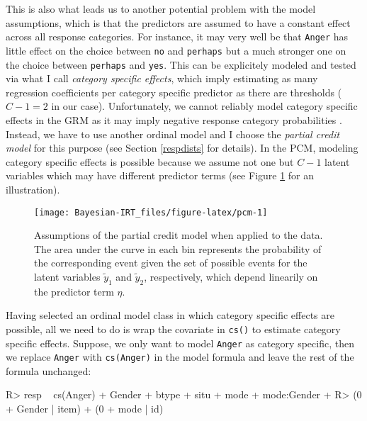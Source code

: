 \documentclass[jss]{jss}
\begin{document}
This is also what leads us to another potential problem with the model
assumptions, which is that the predictors are assumed to have a constant
effect across all response categories. For instance, it may very well be
that \texttt{Anger} has little effect on the choice between \texttt{no}
and \texttt{perhaps} but a much stronger one on the choice between
\texttt{perhaps} and \texttt{yes}. This can be explicitely modeled and
tested via what I call \emph{category specific effects}, which imply
estimating as many regression coefficients per category specific
predictor as there are thresholds (\(C - 1 = 2\) in our case).
Unfortunately, we cannot reliably model category specific effects in the
GRM as it may imply negative response category probabilities
\citep{buerkner2019}. Instead, we have to use another ordinal model and
I choose the \emph{partial credit model} \citep[PCM;][]{rasch1961} for
this purpose (see Section \ref{respdists} for details). In the PCM,
modeling category specific effects is possible because we assume not one
but \(C - 1\) latent variables which may have different predictor terms
(see Figure \ref{fig:pcm} for an illustration).

\begin{CodeChunk}
\begin{figure}

{\centering \texttt{[image: Bayesian-IRT\_files/figure-latex/pcm-1]} 

}

\caption{Assumptions of the partial credit model when applied to the  data. The area under the curve in each bin represents the probability of the corresponding event given the set of possible events for the latent variables $\tilde{y}_1$ and $\tilde{y}_2$, respectively, which depend linearily on the predictor term $\eta$.}\label{fig:pcm}
\end{figure}
\end{CodeChunk}

Having selected an ordinal model class in which category specific
effects are possible, all we need to do is wrap the covariate in
\texttt{cs()} to estimate category specific effects. Suppose, we only
want to model \texttt{Anger} as category specific, then we replace
\texttt{Anger} with \texttt{cs(Anger)} in the model formula and leave
the rest of the formula unchanged:

\begin{CodeChunk}

\begin{CodeInput}
R> resp ~ cs(Anger) + Gender + btype + situ + mode + mode:Gender +
R>   (0 + Gender | item) + (0 + mode | id)
\end{CodeInput}
\end{CodeChunk}
\end{document}

